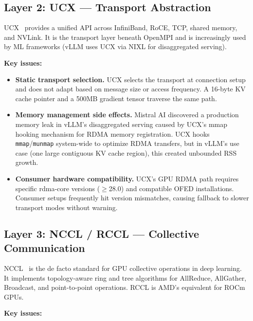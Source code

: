 \documentclass[11pt,letterpaper]{article}
\theoremstyle{definition}
\begin{document}
\subsection{Layer 2: UCX --- Transport Abstraction}

UCX~\cite{ucx} provides a unified API across InfiniBand, RoCE, TCP, shared memory, and NVLink. It is the transport layer beneath OpenMPI and is increasingly used by ML frameworks (vLLM uses UCX via NIXL for disaggregated serving).

\textbf{Key issues:}

\begin{itemize}[leftmargin=1.5em, itemsep=3pt]
\item \textbf{Static transport selection.} UCX selects the transport at connection setup and does not adapt based on message size or access frequency. A 16-byte KV cache pointer and a 500MB gradient tensor traverse the same path.

\item \textbf{Memory management side effects.} Mistral AI discovered a production memory leak in vLLM's disaggregated serving caused by UCX's mmap hooking mechanism for RDMA memory registration. UCX hooks \texttt{mmap}/\texttt{munmap} system-wide to optimize RDMA transfers, but in vLLM's use case (one large contiguous KV cache region), this created unbounded RSS growth.

\item \textbf{Consumer hardware compatibility.} UCX's GPU RDMA path requires specific rdma-core versions ($\geq$28.0) and compatible OFED installations. Consumer setups frequently hit version mismatches, causing fallback to slower transport modes without warning.
\end{itemize}

\subsection{Layer 3: NCCL / RCCL --- Collective Communication}

NCCL~\cite{nccl} is the de facto standard for GPU collective operations in deep learning. It implements topology-aware ring and tree algorithms for AllReduce, AllGather, Broadcast, and point-to-point operations. RCCL is AMD's equivalent for ROCm GPUs.

\textbf{Key issues:}
\end{document}
